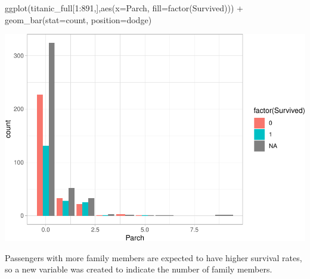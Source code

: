 \documentclass[
]{article}
\newenvironment{Shaded}{\begin{snugshade}}{\end{snugshade}}
\newcommand{\AttributeTok}[1]{\textcolor[rgb]{0.77,0.63,0.00}{#1}}
\newcommand{\CommentTok}[1]{\textcolor[rgb]{0.56,0.35,0.01}{\textit{#1}}}
\newcommand{\DecValTok}[1]{\textcolor[rgb]{0.00,0.00,0.81}{#1}}
\newcommand{\FunctionTok}[1]{\textcolor[rgb]{0.00,0.00,0.00}{#1}}
\newcommand{\NormalTok}[1]{#1}
\newcommand{\OtherTok}[1]{\textcolor[rgb]{0.56,0.35,0.01}{#1}}
\newcommand{\SpecialCharTok}[1]{\textcolor[rgb]{0.00,0.00,0.00}{#1}}
\newcommand{\StringTok}[1]{\textcolor[rgb]{0.31,0.60,0.02}{#1}}
\begin{document}
\begin{Shaded}
\begin{Highlighting}[]
\FunctionTok{ggplot}\NormalTok{(titanic\_full[}\DecValTok{1}\SpecialCharTok{:}\DecValTok{891}\NormalTok{,],}\FunctionTok{aes}\NormalTok{(}\AttributeTok{x=}\NormalTok{Parch, }\AttributeTok{fill=}\FunctionTok{factor}\NormalTok{(Survived))) }\SpecialCharTok{+}
  \FunctionTok{geom\_bar}\NormalTok{(}\AttributeTok{stat=}\StringTok{\textquotesingle{}count\textquotesingle{}}\NormalTok{, }\AttributeTok{position=}\StringTok{\textquotesingle{}dodge\textquotesingle{}}\NormalTok{)}
\end{Highlighting}
\end{Shaded}

\includegraphics{final_pdf_files/figure-latex/unnamed-chunk-14-1.pdf}

Passengers with more family members are expected to have higher survival
rates, so a new variable was created to indicate the number of family
members.

\begin{Shaded}
\end{Shaded}
\end{document}
